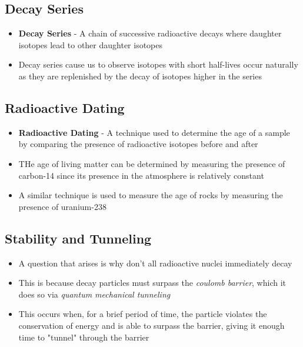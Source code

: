 \subsection{Decay Series}
\begin{itemize}
    \item \textbf{Decay Series} - A chain of successive radioactive decays where daughter isotopes lead to other daughter isotopes
    \item Decay series cause us to observe isotopes with short half-lives occur naturally as they are replenished by the decay of isotopes higher in the series
\end{itemize}

\subsection{Radioactive Dating}
\begin{itemize}
    \item \textbf{Radioactive Dating} - A technique used to determine the age of a sample by comparing the presence of radioactive isotopes before and after
    \item THe age of living matter can be determined by measuring the presence of carbon-14 since its presence in the atmosphere is relatively constant
    \item A similar technique is used to measure the age of rocks by measuring the presence of uranium-238
\end{itemize}

\subsection{Stability and Tunneling}
\begin{itemize}
    \item A question that arises is why don't all radioactive nuclei immediately decay
    \item This is because decay particles must surpass the \emph{coulomb barrier}, which it does so via \emph{quantum mechanical tunneling}
    \item This occurs when, for a brief period of time, the particle violates the conservation of energy and is able to surpass the barrier, giving it enough time to "tunnel" through the barrier
\end{itemize}

